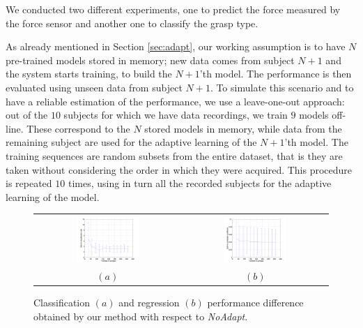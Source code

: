 We conducted two different experiments, one to predict the force measured
by the force sensor and another one to classify the grasp type.

As already mentioned in Section \ref{sec:adapt}, our working
assumption is to have $N$ pre-trained models stored in memory; new
data comes from subject $N+1$ and the system starts training, to build
the $N+1$'th model. The performance is then evaluated using unseen
data from subject $N+1$. To simulate this scenario and to have a
reliable estimation of the performance, we use a leave-one-out
approach: out of the $10$ subjects for which we have data recordings,
we train $9$ models off-line. These correspond to the $N$ stored
models in memory, while data from the remaining subject are  used
for the adaptive learning of the $N+1$'th model. The training
sequences are random subsets from the entire dataset, that is they are taken
without considering the order in which they were acquired. This
procedure is repeated $10$ times, using in turn all the recorded
subjects for the adaptive learning of the model.

\begin{figure}[!ht] \centering
  \begin{tabular}{cc}
    \includegraphics[width=0.45\textwidth]{figs/exp1} &
    \includegraphics[width=0.45\textwidth]{figs/exp2} \\
    $(a)$ & $(b)$ \\
  \end{tabular}
  \caption{Classification $(a)$ and regression $(b)$ performance
    difference obtained by our method with respect to \emph{NoAdapt}.}
  \label{fig:diff_res}
\end{figure}

